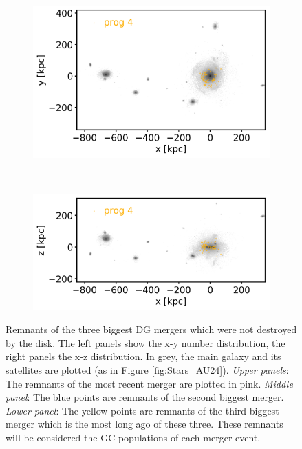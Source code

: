 \begin{figure}[htbp]
    \begin{subfigure}[c]{0.48\textwidth}
    \centering
    	\includegraphics[width=\textwidth]{plots/Dynamics/dist/xy_dist_selected_GCs_prog_4_snap_127.png}
    	\label{fig:prog4_xy}
    \end{subfigure}
    ~ %
    \begin{subfigure}[c]{0.48\textwidth}
        \centering
    	\includegraphics[width=\textwidth]{plots/Dynamics/dist/xz_dist_selected_GCs_prog_4_snap_127.png}
	    \label{fig:prog4_xz}
    \end{subfigure}
    \caption{Remnants of the three biggest \ac{DG} mergers which were not destroyed by the disk. The left panels show the x-y number distribution, the right panels the x-z distribution. In grey, the main galaxy and its satellites are plotted (as in Figure \ref{fig:Stars_AU24}). \textit{Upper panels}: The remnants of the most recent merger are plotted in pink. \textit{Middle panel}: The blue points are remnants of the second biggest merger. \textit{Lower panel}: The yellow points are remnants of the third biggest merger which is the most long ago of these three. These remnants will be considered the \ac{GC} populations of each merger event.}\label{fig:progenitors_distribution}
\end{figure}
